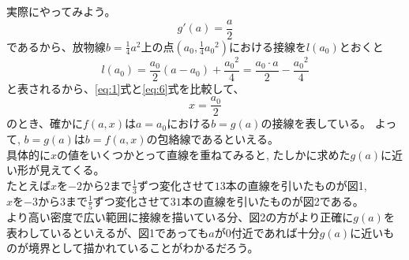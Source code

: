 \documentclass[11pt,a4j,fleqn]{jarticle}
\begin{document}
実際にやってみよう。
\begin{equation} 
g'(a) = \frac{a}{2} \label{eq:5}
\end{equation}
であるから、放物線$b=\frac{1}{4}a^2$上の点$(a_0,\frac{1}{4}{a_0}^2 )$における接線を$l(a_0)$とおくと\\
\begin{equation} 
l(a_0)=\frac{a_0}{2}(a-a_0)+\frac{{a_0}^2}{4}=\frac{a_0 \cdot a}{2} - \frac{{a_0}^2}{4} \label{eq:6}
\end{equation}
と表されるから、\eqref{eq:1}式と\eqref{eq:6}式を比較して、
\begin{equation*} 
x = \frac{a_0}{2}
\end{equation*}
のとき、確かに$f(a,  x)$は$a=a_0$における$b=g(a)$の接線を表している。
よって, $b=g(a)$は$b=f(a,x)$の包絡線であるといえる。\\

具体的に$x$の値をいくつかとって直線を重ねてみると, たしかに求めた$g(a)$に近い形が見えてくる。\\
たとえば$x$を$-2$から$2$まで$\frac{1}{3}$ずつ変化させて$13$本の直線を引いたものが図1, \\
$x$を$-3$から$3$まで$\frac{1}{5}$ずつ変化させて$31$本の直線を引いたものが図2である。\\
より高い密度で広い範囲に接線を描いている分、図2の方がより正確に$g(a)$を表わしているといえるが、図1であっても$a$が0付近であれば十分$g(a)$に近いものが境界として描かれていることがわかるだろう。\\
\\
\end{document}
